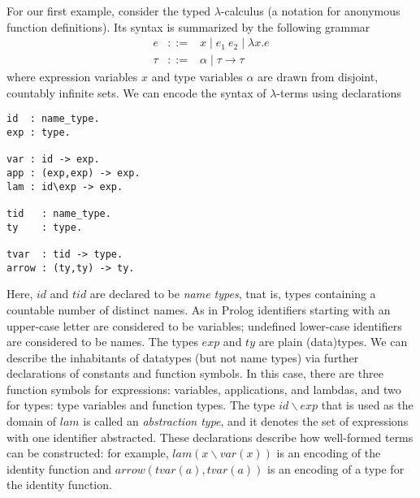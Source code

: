 \documentclass[draft,12pt]{report}
\begin{document}
For our first example, consider the typed $\lambda$-calculus (a
notation for anonymous function definitions).  Its syntax is
summarized by the following grammar
\begin{eqnarray*}
e &::=& x \mid e_1~e_2\mid \lambda x.e\\
\tau &::=& \alpha \mid \tau \to \tau
\end{eqnarray*}
where expression variables $x$ and type variables $\alpha$ are drawn
from disjoint, countably infinite sets.  We can encode the syntax of
$\lambda$-terms using declarations
\begin{center}
\begin{verbatim}
id  : name_type.
exp : type.

var : id -> exp.
app : (exp,exp) -> exp.
lam : id\exp -> exp.

tid   : name_type.
ty    : type.

tvar  : tid -> type.
arrow : (ty,ty) -> ty.
\end{verbatim}
\end{center}
Here, $id$ and $tid$ are declared to be \emph{name types}, tnat is,
types containing a countable number of distinct names.  As in Prolog
identifiers starting with an upper-case letter are considered to be
variables; undefined lower-case identifiers are considered to be
names.  The types $exp$ and $ty$ are plain (data)types.  We can
describe the inhabitants of datatypes (but not name types) via further
declarations of constants and function symbols.  In this case, there
are three function symbols for expressions: variables, applications,
and lambdas, and two for types: type variables and function types.
The type $id\backslash exp$ that is used as the domain of $lam$ is
called an \emph{abstraction type}, and it denotes the set of
expressions with one identifier abstracted.  These declarations
describe how well-formed terms can be constructed: for example, $lam
(x\backslash var (x))$ is an encoding of the identity function and
$arrow(tvar(a),tvar(a))$ is an encoding of a type for the identity
function.
\end{document}
